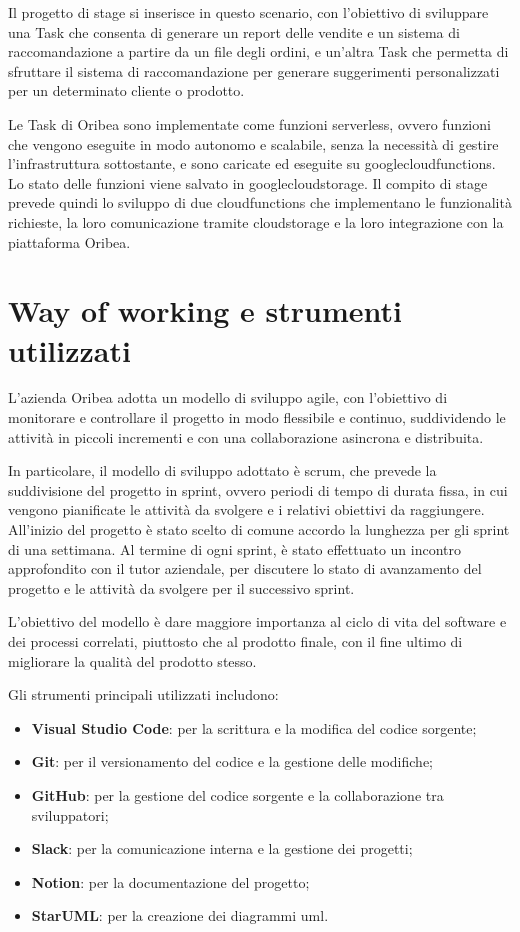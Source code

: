 Il progetto di stage si inserisce in questo scenario, con l'obiettivo di sviluppare una Task che consenta di generare un report delle vendite e un sistema di raccomandazione a partire da un file degli ordini, e un’altra Task che permetta di sfruttare il sistema di raccomandazione per generare suggerimenti personalizzati per un determinato cliente o prodotto.

Le Task di Oribea sono implementate come funzioni serverless, ovvero funzioni che vengono eseguite in modo autonomo e scalabile, senza la necessità di gestire l'infrastruttura sottostante, e sono caricate ed eseguite su \gls{googlecloudfunctions}. Lo stato delle funzioni viene salvato in \gls{googlecloudstorage}. Il compito di stage prevede quindi lo sviluppo di due \gls{cloudfunctions} che implementano le funzionalità richieste, la loro comunicazione tramite \gls{cloudstorage} e la loro integrazione con la piattaforma Oribea.


\section{Way of working e strumenti utilizzati}
\label{sec:way-of-working}

L’azienda Oribea adotta un modello di sviluppo \gls{agile}, con l’obiettivo di monitorare e controllare il progetto in modo flessibile e continuo, suddividendo le attività in piccoli incrementi e con una collaborazione asincrona e distribuita.

In particolare, il modello di sviluppo adottato è \gls{scrum}, che prevede la suddivisione del progetto in sprint, ovvero periodi di tempo di durata fissa, in cui vengono pianificate le attività da svolgere e i relativi obiettivi da raggiungere. All'inizio del progetto è stato scelto di comune accordo la lunghezza per gli sprint di una settimana. Al termine di ogni sprint, è stato effettuato un incontro approfondito con il tutor aziendale, per discutere lo stato di avanzamento del progetto e le attività da svolgere per il successivo sprint.

L’obiettivo del modello è dare maggiore importanza al ciclo di vita del software e dei processi correlati, piuttosto che al prodotto finale, con il fine ultimo di migliorare la qualità del prodotto stesso.

Gli strumenti principali utilizzati includono:
\begin{itemize}
    \item \textbf{Visual Studio Code}: per la scrittura e la modifica del codice sorgente;
    \item \textbf{Git}: per il versionamento del codice e la gestione delle modifiche;
    \item \textbf{GitHub}: per la gestione del codice sorgente e la collaborazione tra sviluppatori;
    \item \textbf{Slack}: per la comunicazione interna e la gestione dei progetti;
    \item \textbf{Notion}: per la documentazione del progetto;
    \item \textbf{StarUML}: per la creazione dei diagrammi \gls{uml}.
\end{itemize}


